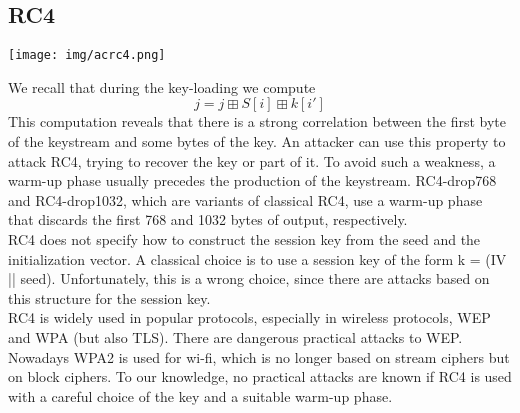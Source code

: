 \documentclass[a4paper, 10pt, titlepage]{article}
\begin{document}
\subsection{RC4}
\begin{center}
\texttt{[image: img/acrc4.png]}
\end{center}
We recall that during the key-loading we compute
$$j = j \boxplus S[i] \boxplus k[i']$$
This computation reveals that there is a strong correlation between the first byte of the keystream and some bytes of the key. An attacker can use this property to attack RC4, trying to recover the key or part of it. To avoid such a weakness, a warm-up phase usually precedes the production of the keystream. RC4-drop768 and RC4-drop1032, which are variants of classical RC4, use a warm-up phase that discards the first 768 and 1032 bytes of output, respectively. \medskip\\
RC4 does not specify how to construct the session key from the seed and the initialization vector. A classical choice is to use a session key of the form k = (IV || seed). Unfortunately, this is a wrong choice, since there are attacks based on this structure for the session key. \medskip\\
RC4 is widely used in popular protocols, especially in wireless protocols, WEP and WPA (but also TLS). There are dangerous practical attacks to WEP. Nowadays WPA2 is used for wi-fi, which is no longer based on stream ciphers but on block ciphers. To our knowledge, no practical attacks are known if RC4 is used with a careful choice of the key and a suitable warm-up phase.

\newpage
\end{document}
